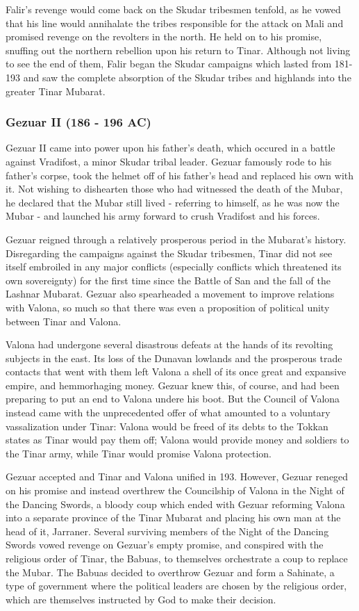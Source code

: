 			Falir's revenge would come back on the Skudar tribesmen tenfold, as he vowed that his line would annihalate the tribes responsible for the attack on Mali and promised revenge on the revolters in the north. He held on to his promise, snuffing out the northern rebellion upon his return to Tinar. Although not living to see the end of them, Falir began the Skudar campaigns which lasted from 181-193 and saw the complete absorption of the Skudar tribes and highlands into the greater Tinar Mubarat.
		\subsubsection{Gezuar II (186 - 196 AC)}
			Gezuar II came into power upon his father's death, which occured in a battle against Vradifost, a minor Skudar tribal leader. Gezuar famously rode to his father's corpse, took the helmet off of his father's head and replaced his own with it. Not wishing to dishearten those who had witnessed the death of the Mubar, he declared that the Mubar still lived - referring to himself, as he was now the Mubar - and launched his army forward to crush Vradifost and his forces.
			
			Gezuar reigned through a relatively prosperous period in the Mubarat's history. Disregarding the campaigns against the Skudar tribesmen, Tinar did not see itself embroiled in any major conflicts (especially conflicts which threatened its own sovereignty) for the first time since the Battle of San and the fall of the Lashnar Mubarat. Gezuar also spearheaded a movement to improve relations with Valona, so much so that there was even a proposition of political unity between Tinar and Valona.
			
			Valona had undergone several disastrous defeats at the hands of its revolting subjects in the east. Its loss of the Dunavan lowlands and the prosperous trade contacts that went with them left Valona a shell of its once great and expansive empire, and hemmorhaging money. Gezuar knew this, of course, and had been preparing to put an end to Valona undere his boot. But the Council of Valona instead came with the unprecedented offer of what amounted to a voluntary vassalization under Tinar: Valona would be freed of its debts to the Tokkan states as Tinar would pay them off; Valona would provide money and soldiers to the Tinar army, while Tinar would promise Valona protection.
			
			Gezuar accepted and Tinar and Valona unified in 193. However, Gezuar reneged on his promise and instead overthrew the Councilship of Valona in the Night of the Dancing Swords, a bloody coup which ended with Gezuar reforming Valona into a separate province of the Tinar Mubarat and placing his own man at the head of it, Jarraner. Several surviving members of the Night of the Dancing Swords vowed revenge on Gezuar's empty promise, and conspired with the religious order of Tinar, the Babuas, to themselves orchestrate a coup to replace the Mubar. The Babuas decided to overthrow Gezuar and form a Sahinate, a type of government where the political leaders are chosen by the religious order, which are themselves instructed by God to make their decision. 
			
